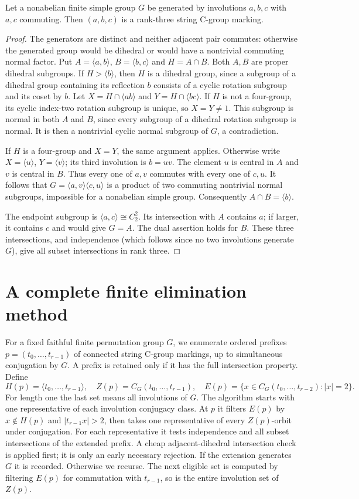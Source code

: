 \documentclass[11pt,a4paper]{article}
\newcommand{\gen}[1]{\langle #1\rangle}
\begin{document}
\begin{lemma}\label{rank3}
Let a nonabelian finite simple group $G$ be generated by involutions $a,b,c$
with $a,c$ commuting. Then $(a,b,c)$ is a rank-three string C-group marking.
\end{lemma}
\begin{proof}
The generators are distinct and neither adjacent pair commutes: otherwise
the generated group would be dihedral or would have a nontrivial commuting
normal factor. Put $A=\gen{a,b}$, $B=\gen{b,c}$ and $H=A\cap B$.
Both $A,B$ are proper dihedral subgroups. If $H>\gen b$, then $H$ is a
dihedral group, since a subgroup of a dihedral group containing its reflection
$b$ consists of a cyclic rotation subgroup and its coset by $b$.
Let $X=H\cap\gen{ab}$ and $Y=H\cap\gen{bc}$.
If $H$ is not a four-group, its cyclic index-two rotation subgroup is unique,
so $X=Y\ne1$. This subgroup is normal in both $A$ and $B$, since every
subgroup of a dihedral rotation subgroup is normal. It is then a nontrivial
cyclic normal subgroup of $G$, a contradiction.

If $H$ is a four-group and $X=Y$, the same argument applies. Otherwise
write $X=\gen u$, $Y=\gen v$; its third involution is $b=uv$.
The element $u$ is central in $A$ and $v$ is central in $B$. Thus every
one of $a,v$ commutes with every one of $c,u$. It follows that
$G=\gen{a,v}\gen{c,u}$ is a product of two commuting nontrivial normal
subgroups, impossible for a nonabelian simple group.
Consequently $A\cap B=\gen b$.

The endpoint subgroup is $\gen{a,c}\cong C_2^2$. Its intersection with
$A$ contains $a$; if larger, it contains $c$ and would give $G=A$.
The dual assertion holds for $B$. These three intersections, and independence
(which follows since no two involutions generate $G$), give all subset
intersections in rank three.
\end{proof}

\section{A complete finite elimination method}
For a fixed faithful finite permutation group $G$, we enumerate ordered
prefixes $p=(t_0,\ldots,t_{r-1})$ of connected string C-group markings,
up to simultaneous conjugation by $G$. A prefix is retained only if it has
the full intersection property. Define
\[
 H(p)=\gen{t_0,\ldots,t_{r-1}},\quad
 Z(p)=C_G(t_0,\ldots,t_{r-1}),\quad
 E(p)=\{x\in C_G(t_0,\ldots,t_{r-2}):|x|=2\}.
\]
For length one the last set means all involutions of $G$.
The algorithm starts with one representative of each involution conjugacy
class. At $p$ it filters $E(p)$ by $x\notin H(p)$ and
$|t_{r-1}x|>2$, then takes one representative of every $Z(p)$-orbit
under conjugation. For each representative it tests independence and all
subset intersections of the extended prefix. A cheap adjacent-dihedral
intersection check is applied first; it is only an early necessary rejection.
If the extension generates $G$ it is recorded. Otherwise we recurse.
The next eligible set is computed by filtering $E(p)$ for commutation with
$t_{r-1}$, so is the entire involution set of $Z(p)$.
\end{document}

